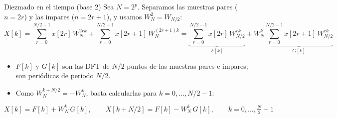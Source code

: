 \documentclass[aspectratio=169,11pt]{beamer}
\begin{document}
\begin{frame}{Diezmado en el tiempo (base 2)}
  Sea $N=2^p$. Separamos las muestras pares ($n=2r$) y las impares ($n=2r+1$), y usamos $W_N^2=W_{N/2}$:
  \[
    X[k]=\sum_{r=0}^{N/2-1}x[2r]\,W_N^{2rk}+\sum_{r=0}^{N/2-1}x[2r+1]\,W_N^{(2r+1)k}
    =\underbrace{\sum_{r=0}^{N/2-1}x[2r]\,W_{N/2}^{rk}}_{F[k]}+W_N^{k}\underbrace{\sum_{r=0}^{N/2-1}x[2r+1]\,W_{N/2}^{rk}}_{G[k]}
  \]
  \begin{itemize}
    \item $F[k]$ y $G[k]$ son las DFT de $N/2$ puntos de las muestras pares e impares; son periódicas de periodo $N/2$.
    \item Como $W_N^{k+N/2}=-W_N^k$, basta calcularlas para $k=0,\dots,N/2-1$:
  \end{itemize}
  \begin{importante}[Mariposa]
    \[
      X[k]=F[k]+W_N^k\,G[k],\qquad X[k+N/2]=F[k]-W_N^k\,G[k],\qquad k=0,\dots,\tfrac N2-1
    \]
  \end{importante}
\end{frame}
\end{document}
